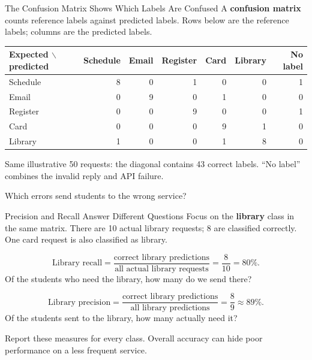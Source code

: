 \documentclass[aspectratio=169]{beamer}
\begin{document}
\begin{frame}{The Confusion Matrix Shows Which Labels Are Confused}
  \small A \textbf{confusion matrix} counts reference labels against predicted labels. Rows below are the reference labels; columns are the predicted labels.
  \par\vspace{0.6em}
  \begin{center}
  \renewcommand{\arraystretch}{1.25}
  \begin{tabular}{@{}lrrrrrr@{}}
    \toprule
    \textbf{Expected $\backslash$ predicted} & Schedule & Email & Register & Card & Library & No label \\
    \midrule
    Schedule & \textcolor{AMU_dk2}{8} & 0 & 1 & 0 & 0 & 1 \\
    Email    & 0 & \textcolor{AMU_dk2}{9} & 0 & 1 & 0 & 0 \\
    Register & 0 & 0 & \textcolor{AMU_dk2}{9} & 0 & 0 & 1 \\
    Card     & 0 & 0 & 0 & \textcolor{AMU_dk2}{9} & 1 & 0 \\
    Library  & 1 & 0 & 0 & 1 & \textcolor{AMU_dk2}{8} & 0 \\
    \bottomrule
  \end{tabular}
  \end{center}
  \small Same illustrative 50 requests: the diagonal contains 43 correct labels. ``No label'' combines the invalid reply and API failure.
  \par\vspace{0.3em}
  Which errors send students to the wrong service?
\end{frame}

\begin{frame}{Precision and Recall Answer Different Questions}
  \small Focus on the \textbf{library} class in the same matrix. There are 10 actual library requests; 8 are classified correctly. One card request is also classified as library.
  \par\vspace{0.7em}
  \[
    \text{Library recall}
    =\frac{\text{correct library predictions}}{\text{all actual library requests}}
    =\frac{8}{10}=80\%.
  \]
  \small Of the students who need the library, how many do we send there?
  \par\vspace{0.5em}
  \[
    \text{Library precision}
    =\frac{\text{correct library predictions}}{\text{all library predictions}}
    =\frac{8}{9}\approx89\%.
  \]
  \small Of the students sent to the library, how many actually need it?
  \par\vspace{0.7em}
  Report these measures for every class. Overall accuracy can hide poor performance on a less frequent service.
\end{frame}
\end{document}
